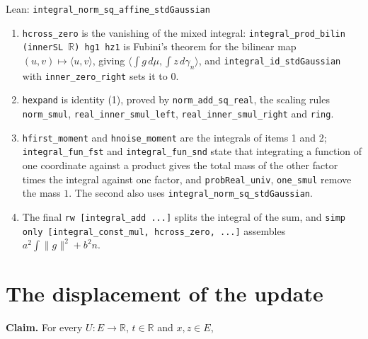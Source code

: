 \documentclass[11pt,a4paper]{article}
\begin{document}
\begin{leanbox}{Lean: \texttt{integral\_\allowbreak{}norm\_\allowbreak{}sq\_\allowbreak{}affine\_\allowbreak{}stdGaussian}}
\begin{enumerate}
\item \texttt{hcross\_\allowbreak{}zero} is the vanishing of the mixed integral: \texttt{integral\_\allowbreak{}prod\_\allowbreak{}bilin (inner\allowbreak{}SL \ensuremath{\mathbb R}) hg1 hz1} is Fubini's theorem for the bilinear map \((u,v)\mapsto\langle u,v\rangle\), giving \(\langle\int g\,d\mu,\int z\,d\gamma_n\rangle\), and \texttt{integral\_\allowbreak{}id\_\allowbreak{}std\allowbreak{}Gaussian} with \texttt{inner\_\allowbreak{}zero\_\allowbreak{}right} sets it to \(0\).

\item \texttt{hexpand} is identity (1), proved by \texttt{norm\_\allowbreak{}add\_\allowbreak{}sq\_\allowbreak{}real}, the scaling rules \texttt{norm\_\allowbreak{}smul}, \texttt{real\_\allowbreak{}inner\_\allowbreak{}smul\_\allowbreak{}left}, \texttt{real\_\allowbreak{}inner\_\allowbreak{}smul\_\allowbreak{}right} and \texttt{ring}.

\item \texttt{hfirst\_\allowbreak{}moment} and \texttt{hnoise\_\allowbreak{}moment} are the integrals of items 1 and 2; \texttt{integral\_\allowbreak{}fun\_\allowbreak{}fst} and \texttt{integral\_\allowbreak{}fun\_\allowbreak{}snd} state that integrating a function of one coordinate against a product gives the total mass of the other factor times the integral against one factor, and \texttt{prob\allowbreak{}Real\_\allowbreak{}univ}, \texttt{one\_\allowbreak{}smul} remove the mass \(1\). The second also uses \texttt{integral\_\allowbreak{}norm\_\allowbreak{}sq\_\allowbreak{}std\allowbreak{}Gaussian}.

\item The final \texttt{rw [integral\_\allowbreak{}add .\allowbreak{}.\allowbreak{}.\allowbreak{}]} splits the integral of the sum, and \texttt{simp only [integral\_\allowbreak{}const\_\allowbreak{}mul, hcross\_\allowbreak{}zero, .\allowbreak{}.\allowbreak{}.\allowbreak{}]} assembles \(a^2\int\|g\|^2+b^2n\).

\end{enumerate}
\end{leanbox}

\section{\texorpdfstring{The displacement of the update}{The displacement of the update}}


\textbf{Claim.} For every \(U:E\to\mathbb R\), \(t\in\mathbb R\) and \(x,z\in E\),
\end{document}
